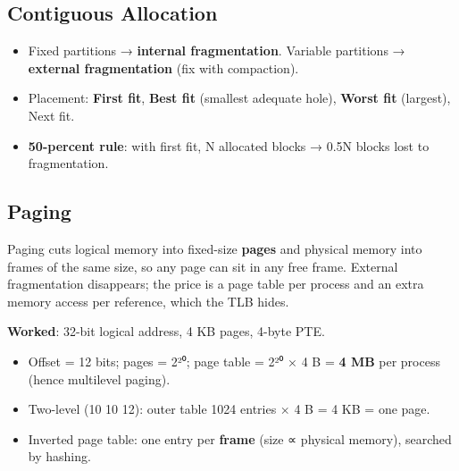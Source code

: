 \needspace{95pt}

\hypertarget{p2-05--71-contiguous-allocation}{%
\subsection{Contiguous Allocation}\label{p2-05--71-contiguous-allocation}}

\begin{itemize}
\tightlist
\item
  Fixed partitions → \textbf{internal fragmentation}. Variable partitions → \textbf{external fragmentation} (fix with compaction).
\item
  Placement: \textbf{First fit}, \textbf{Best fit} (smallest adequate hole), \textbf{Worst fit} (largest), Next fit.
\item
  \textbf{50-percent rule}: with first fit, N allocated blocks → 0.5N blocks lost to fragmentation.
\end{itemize}

\needspace{125pt}

\hypertarget{p2-05--72-paging}{%
\subsection{Paging}\label{p2-05--72-paging}}

Paging cuts logical memory into fixed-size \textbf{pages} and physical memory into frames of the same size, so
any page can sit in any free frame. External fragmentation disappears; the price is a page table per
process and an extra memory access per reference, which the TLB hides.





\textbf{Worked}: 32-bit logical address, 4 KB pages, 4-byte PTE.

\begin{itemize}
\tightlist
\item
  Offset = 12 bits; pages = 2²⁰; page table = 2²⁰ × 4 B = \textbf{4 MB} per process (hence multilevel paging).
\item
  Two-level (10 \textbar{} 10 \textbar{} 12): outer table 1024 entries × 4 B = 4 KB = one page.
\item
  Inverted page table: one entry per \textbf{frame} (size ∝ physical memory), searched by hashing.
\end{itemize}

\needspace{95pt}

